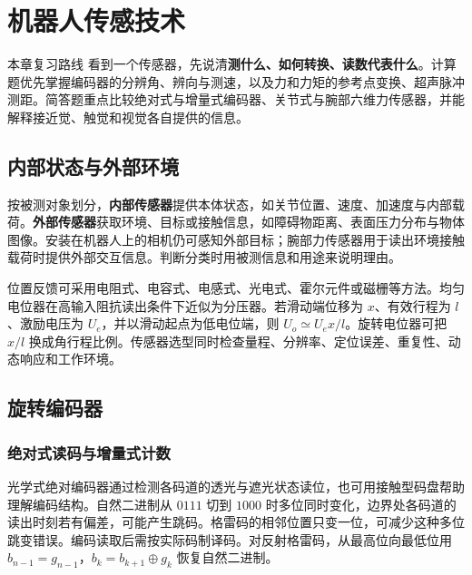 \chapter{机器人传感技术}
\label{chap:robot-sensing}

\begin{focusbox}{本章复习路线}
看到一个传感器，先说清\textbf{测什么、如何转换、读数代表什么}。计算题优先掌握编码器的分辨角、辨向与测速，以及力和力矩的参考点变换、超声脉冲测距。简答题重点比较绝对式与增量式编码器、关节式与腕部六维力传感器，并能解释接近觉、触觉和视觉各自提供的信息。
\end{focusbox}

\section{内部状态与外部环境}

按被测对象划分，\textbf{内部传感器}提供本体状态，如关节位置、速度、加速度与内部载荷。\textbf{外部传感器}获取环境、目标或接触信息，如障碍物距离、表面压力分布与物体图像。安装在机器人上的相机仍可感知外部目标；腕部力传感器用于读出环境接触载荷时提供外部交互信息。判断分类时用被测信息和用途来说明理由。

位置反馈可采用电阻式、电容式、电感式、光电式、霍尔元件或磁栅等方法。均匀电位器在高输入阻抗读出条件下近似为分压器。若滑动端位移为 $x$、有效行程为 $l$、激励电压为 $U_e$，并以滑动起点为低电位端，则 $U_o\simeq U_e x/l$。旋转电位器可把 $x/l$ 换成角行程比例。传感器选型同时检查量程、分辨率、定位误差、重复性、动态响应和工作环境。

\section{旋转编码器}
\label{sec:rotary-encoders}

\subsection{绝对式读码与增量式计数}


光学式绝对编码器通过检测各码道的透光与遮光状态读位，也可用接触型码盘帮助理解编码结构。自然二进制从 $0111$ 切到 $1000$ 时多位同时变化，边界处各码道的读出时刻若有偏差，可能产生跳码。格雷码的相邻位置只变一位，可减少这种多位跳变错误。编码读取后需按实际码制译码。对反射格雷码，从最高位向最低位用 $b_{n-1}=g_{n-1}$，$b_k=b_{k+1}\oplus g_k$ 恢复自然二进制。

